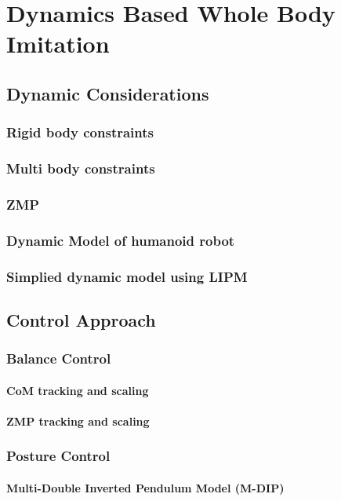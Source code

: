 \chapter{Dynamics Based Whole Body Imitation}

\section{Dynamic Considerations}
\subsection{Rigid body constraints}
\subsection{Multi body constraints}
\subsection{ZMP}
\subsection{Dynamic Model of humanoid robot}
\subsection{Simplied dynamic model using LIPM}

\section{Control Approach}
\subsection{Balance Control}
\subsubsection{CoM tracking and scaling}
\subsubsection{ZMP tracking and scaling}

\subsection{Posture Control}
\subsubsection{Multi-Double Inverted Pendulum Model (M-DIP)}
